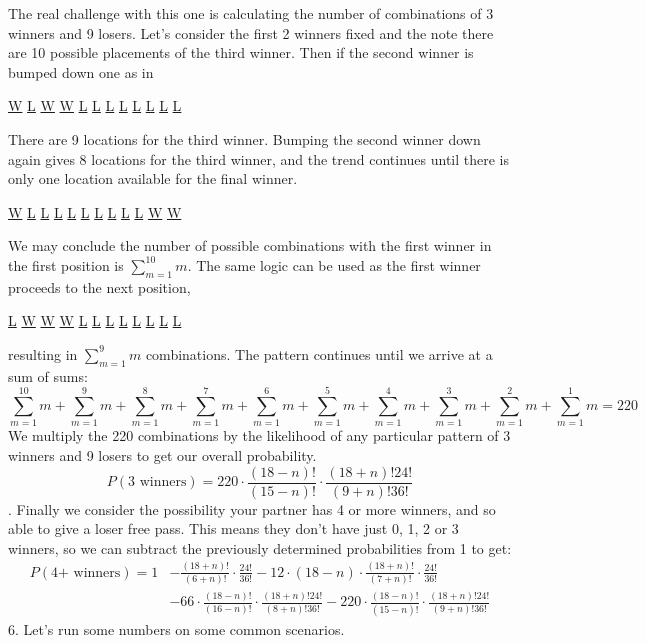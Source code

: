 \documentclass[11pt]{article}
\begin{document}
The real challenge with this one is calculating the number of combinations of 3 winners and 9 losers. Let's consider the first 2 winners fixed and the note there are 10 possible placements of the third winner. Then if the second winner is bumped down one as in
\begin {center}
  \underline{W} \underline{L} \underline{W} \underline{W} \underline{L} \underline{L} \underline{L} \underline{L} \underline{L} \underline{L} \underline{L} \underline{L}\\
  \end{center}
There are 9 locations for the third winner. Bumping the second winner down again gives 8 locations for the third winner, and the trend continues until there is only one location available for the final winner. 
\begin {center}
  \underline{W} \underline{L} \underline{L} \underline{L} \underline{L} \underline{L} \underline{L} \underline{L} \underline{L} \underline{L} \underline{W} \underline{W}\\
  \end{center}
We may conclude the number of possible combinations with the first winner in the first position is $ \displaystyle\sum_{m=1}^{10} m $. The same logic can be used as the first winner proceeds to the next position,
\begin {center}
  \underline{L} \underline{W} \underline{W} \underline{W} \underline{L} \underline{L} \underline{L} \underline{L} \underline{L} \underline{L} \underline{L} \underline{L}\\
  \end{center}
resulting in $ \displaystyle\sum_{m=1}^{9} m $ combinations. The pattern continues until we arrive at a sum of sums:
\begin{equation}
  \displaystyle\sum_{m=1}^{10} m +\displaystyle\sum_{m=1}^{9} m +\displaystyle\sum_{m=1}^{8} m +\displaystyle\sum_{m=1}^{7} m +\displaystyle\sum_{m=1}^{6} m +\displaystyle\sum_{m=1}^{5} m +\displaystyle\sum_{m=1}^{4} m +\displaystyle\sum_{m=1}^{3} m +\displaystyle\sum_{m=1}^{2} m +\displaystyle\sum_{m=1}^{1} m= 220
\end{equation}
We multiply the 220 combinations by the likelihood of any particular pattern of 3 winners and 9 losers to get our overall probability.
\begin {equation} 
P(3 \text{ winners})=220\cdot \frac{(18-n)!}{(15-n)!}\cdot \frac{(18+n)!24!}{(9+n)!36!}
\end{equation}
. Finally we consider the possibility your partner has 4 or more winners, and so able to give a loser free pass. This means they don't have just 0, 1, 2 or 3 winners, so we can subtract the previously determined probabilities from 1 to get:
\begin {equation}
  \begin{aligned}
    P(4 \text{+ winners})=1&-\frac{(18+n)!}{(6+n)!}\cdot \frac{24!}{36!} -12\cdot (18-n)\cdot \frac{(18+n)!}{(7+n)!}\cdot \frac{24!}{36!}\\
    & -66 \cdot \frac{(18-n)!}{(16-n)!}\cdot \frac{(18+n)!24!}{(8+n)!36!}  - 220\cdot \frac{(18-n)!}{(15-n)!}\cdot \frac{(18+n)!24!}{(9+n)!36!}
\end{aligned}
\end{equation}
6. Let's run some numbers on some common scenarios. 
\end{document}
